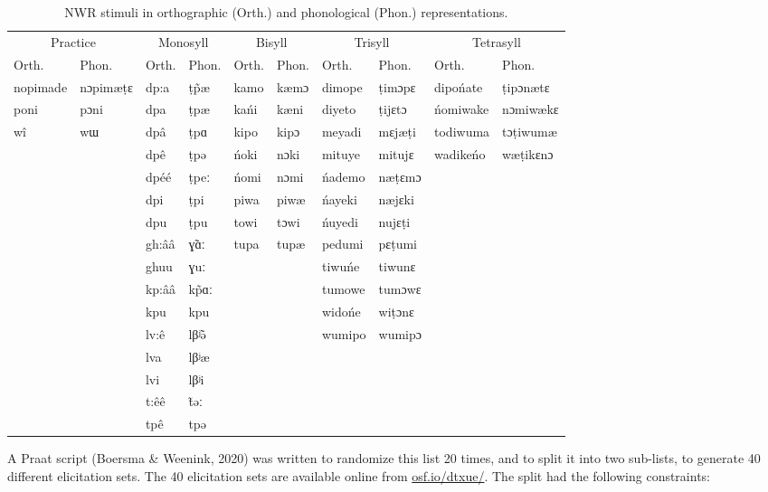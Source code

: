 \documentclass[
  english,
  ,man,floatsintext]{apa6}
\begin{document}
\begin{table}

\caption{\label{tab:tabstims}NWR stimuli in orthographic (Orth.) and phonological (Phon.) representations.}
\centering
\begin{tabular}[t]{llllllllll}
\toprule
\multicolumn{2}{c}{Practice} & \multicolumn{2}{c}{Monosyll} & \multicolumn{2}{c}{Bisyll} & \multicolumn{2}{c}{Trisyll} & \multicolumn{2}{c}{Tetrasyll} \\
\cmidrule(l{3pt}r{3pt}){1-2} \cmidrule(l{3pt}r{3pt}){3-4} \cmidrule(l{3pt}r{3pt}){5-6} \cmidrule(l{3pt}r{3pt}){7-8} \cmidrule(l{3pt}r{3pt}){9-10}
Orth. & Phon. & Orth. & Phon. & Orth. & Phon. & Orth. & Phon. & Orth. & Phon.\\
\midrule
nopimade & nɔpimæṭɛ & dp:a & ṭp̃æ & kamo & kæmɔ & dimope & ṭimɔpɛ & dipońate & ṭipɔnætɛ\\
poni & pɔni & dpa & ṭpæ & kańi & kæni & diyeto & ṭijɛtɔ & ńomiwake & nɔmiwækɛ\\
wî & wɯ & dpâ & ṭpɑ & kipo & kipɔ & meyadi & mɛjæṭi & todiwuma & tɔṭiwumæ\\
 &  & dpê & ṭpə & ńoki & nɔki & mituye & mitujɛ & wadikeńo & wæṭikɛnɔ\\
 &  & dpéé & ṭpeː & ńomi & nɔmi & ńademo & næṭɛmɔ &  & \\
\addlinespace
 &  & dpi & ṭpi & piwa & piwæ & ńayeki & næjɛki &  & \\
 &  & dpu & ṭpu & towi & tɔwi & ńuyedi & nujɛṭi &  & \\
 &  & gh:ââ & ɣ̃ɑː & tupa & tupæ & pedumi & pɛṭumi &  & \\
 &  & ghuu & ɣuː &  &  & tiwuńe & tiwunɛ &  & \\
 &  & kp:ââ & kp̃ɑː &  &  & tumowe & tumɔwɛ &  & \\
\addlinespace
 &  & kpu & kpu &  &  & widońe & wiṭɔnɛ &  & \\
 &  & lv:ê & lβʲ̃ə &  &  & wumipo & wumipɔ &  & \\
 &  & lva & lβʲæ &  &  &  &  &  & \\
 &  & lvi & lβʲi &  &  &  &  &  & \\
 &  & t:êê & t̃əː &  &  &  &  &  & \\
\addlinespace
 &  & tpê & tpə &  &  &  &  &  & \\
\bottomrule
\end{tabular}
\end{table}

A Praat script (Boersma \& Weenink, 2020) was written to randomize this list 20 times, and to split it into two sub-lists, to generate 40 different elicitation sets. The 40 elicitation sets are available online from \href{https://osf.io/dtxue/}{osf.io/dtxue/}. The split had the following constraints:
\end{document}
